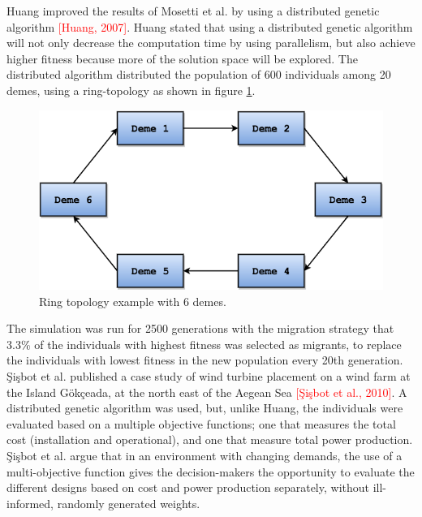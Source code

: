 \documentclass{article}
\begin{document}
\noindent Huang improved the results of Mosetti et al. by using a distributed genetic algorithm \textcolor{red}{[Huang, 2007]}. Huang stated that using a distributed genetic algorithm will not only decrease the computation time by using parallelism, but also achieve higher fitness because more of the solution space will be explored. The distributed algorithm distributed the population of 600 individuals among 20 demes, using a ring-topology as shown in figure \ref{Ring Topology}.


\begin{figure}[h!]
\begin{center}
\includegraphics[scale=0.3]{"Ring Topology"}
\caption{Ring topology example with 6 demes.}
\label{Ring Topology}
\end{center}
\end{figure}


The simulation was run for 2500 generations with the migration strategy that 3.3\% of the individuals with highest fitness was selected as migrants, to replace the individuals with lowest fitness in the new population every 20th generation. \\


\noindent \c{S}i\c{s}bot et al. published a case study of wind turbine placement on a wind farm at the Island G{\"o}k\c{c}eada, at the north east of the Aegean Sea \textcolor{red}{[\c{S}i\c{s}bot et al., 2010]}. A distributed genetic algorithm was used, but, unlike Huang, the individuals were evaluated based on a multiple objective functions; one that measures the total cost (installation and operational), and one that measure total power production. \c{S}i\c{s}bot et al. argue that in an environment with changing demands, the use of a multi-objective function gives the decision-makers the opportunity to evaluate the different designs based on cost and power production separately, without ill-informed, randomly generated weights.
\end{document}
